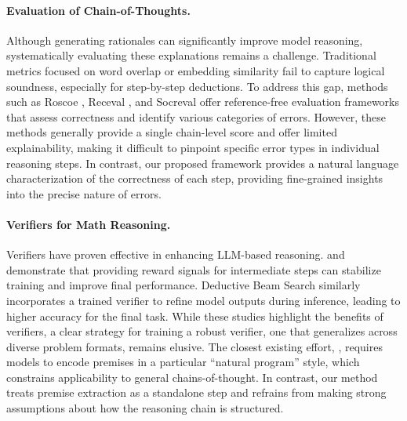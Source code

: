 \paragraph{Evaluation of Chain-of-Thoughts.}
Although generating rationales can significantly improve model reasoning, systematically evaluating these explanations remains a challenge. Traditional metrics focused on word overlap or embedding similarity \cite{celikyilmaz2021evaluationtextgenerationsurvey, reiter-2019-natural} fail to capture logical soundness, especially for step-by-step deductions. To address this gap, methods such as Roscoe \cite{golovneva2023roscoesuitemetricsscoring}, Receval \cite{prasad2023recevalevaluatingreasoningchains}, and Socreval \cite{he2024socrevallargelanguagemodels} offer reference-free evaluation frameworks that assess correctness and identify various categories of errors. However, these methods generally provide a single chain-level score and offer limited explainability, making it difficult to pinpoint specific error types in individual reasoning steps. In contrast, our proposed framework provides a natural language characterization of the correctness of each step, providing fine-grained insights into the precise nature of errors.

\paragraph{Verifiers for Math Reasoning.}  
Verifiers have proven effective in enhancing LLM-based reasoning. \citet{uesato2022solvingmathwordproblems} and \citet{lightman2023letsverifystepstep} demonstrate that providing reward signals for intermediate steps can stabilize training and improve final performance. Deductive Beam Search \cite{zhu2024deductivebeamsearchdecoding} similarly incorporates a trained verifier to refine model outputs during inference, leading to higher accuracy for the final task. While these studies highlight the benefits of verifiers, a clear strategy for training a robust verifier, one that generalizes across diverse problem formats, remains elusive. The closest existing effort, \citet{ling2023deductiveverificationchainofthoughtreasoning}, requires models to encode premises in a particular “natural program” style, which constrains applicability to general chains-of-thought. In contrast, our method treats premise extraction as a standalone step and refrains from making strong assumptions about how the reasoning chain is structured.



